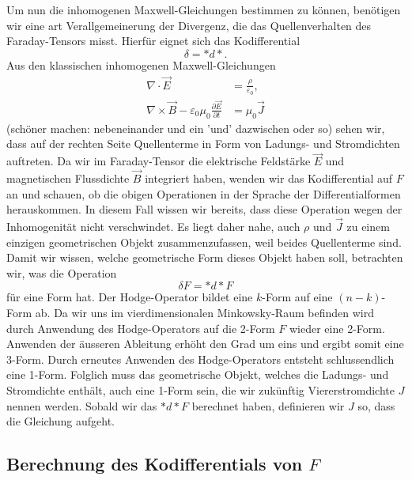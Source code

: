 Um nun die inhomogenen Maxwell-Gleichungen bestimmen zu können, benötigen wir eine art Verallgemeinerung der Divergenz, die das Quellenverhalten des Faraday-Tensors misst. Hierfür eignet sich das Kodifferential
\begin{equation*}
	\delta = \ast d \ast.
\end{equation*}
Aus den klassischen inhomogenen Maxwell-Gleichungen
\begin{align}
	\nabla \cdot \vec{E} &= \frac{\rho}{\varepsilon_0},\\
	\nabla \times \vec{B} - \varepsilon_0 \mu_0 \frac{\partial \vec{E}}{\partial t}&= \mu_0 \vec{J}
\end{align}
(schöner machen: nebeneinander und ein 'und' dazwischen oder so)
sehen wir, dass auf der rechten Seite Quellenterme in Form von Ladungs- und Stromdichten auftreten.
Da wir im Faraday-Tensor die elektrische Feldstärke $\vec{E}$ und magnetischen Flussdichte $\vec{B}$ integriert haben, wenden wir das Kodifferential auf $F$ an und schauen, ob die obigen Operationen in der Sprache der Differentialformen herauskommen.
In diesem Fall wissen wir bereits, dass diese Operation wegen der Inhomogenität nicht verschwindet.
Es liegt daher nahe, auch $\rho$ und $\vec{J}$ zu einem einzigen geometrischen Objekt zusammenzufassen, weil beides Quellenterme sind.
Damit wir wissen, welche geometrische Form dieses Objekt haben soll, betrachten wir, was die Operation 
\begin{equation*}
	\delta F = \ast d\ast F
\end{equation*}
für eine Form hat.
Der Hodge-Operator bildet eine $k$-Form auf eine $(n-k)$-Form ab.
Da wir uns im vierdimensionalen Minkowsky-Raum befinden wird durch Anwendung des Hodge-Operators auf die 2-Form $F$ wieder eine 2-Form.
Anwenden der äusseren Ableitung erhöht den Grad um eins und ergibt somit eine 3-Form.
Durch erneutes Anwenden des Hodge-Operators entsteht schlussendlich eine 1-Form.
Folglich muss das geometrische Objekt, welches die Ladungs- und Stromdichte enthält, auch eine 1-Form sein, die wir zukünftig Viererstromdichte $J$ nennen werden.
Sobald wir das $\ast d \ast F$ berechnet haben, definieren wir $J$ so, dass die Gleichung aufgeht.

\subsection{Berechnung des Kodifferentials von $F$}

